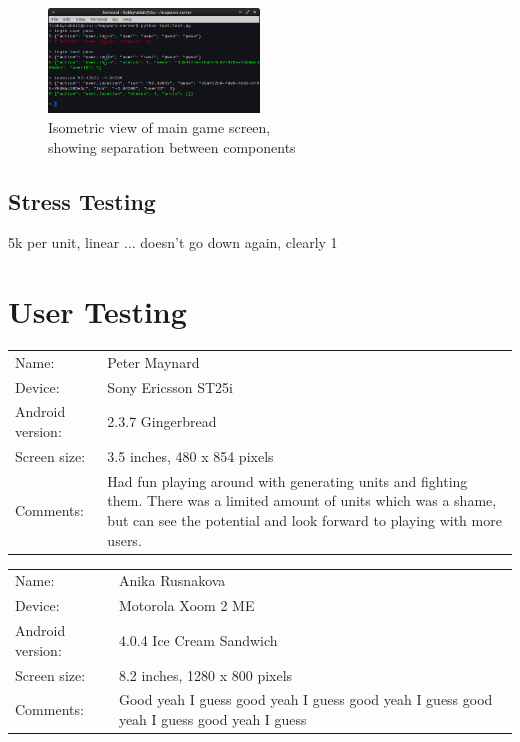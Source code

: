 \begin{figure}[H]
  \centering
   \includegraphics[width=0.5\textwidth]{Images/test.png}
  \caption{Isometric view of main game screen,\\showing separation between components}
  \label{fig:isogui}
\end{figure}

\subsection{Stress Testing}
5k per unit, linear ... doesn't go down again, clearly
1%



\section{User Testing}

\renewcommand{\arraystretch}{1.5}
\begin{tabular}{l  p{11cm}}
	\hline
	Name: & Peter Maynard \\
	\hdashline
	Device: & Sony Ericsson ST25i \\
	\hdashline
	Android version: & 2.3.7 Gingerbread \\
	\hdashline
	Screen size: & 3.5 inches, 480 x 854 pixels \\
	\hdashline
	Comments: & Had fun playing around with generating units and fighting them. There was a limited amount of units which was a shame, but can see the potential and look forward to playing with more users. \\
	\hline
\end{tabular}

\begin{tabular}{l  p{11cm}}
	\hline
	Name: & Anika Rusnakova \\
	\hdashline
	Device: & Motorola Xoom 2 ME \\
	\hdashline
	Android version: & 4.0.4 Ice Cream Sandwich \\
	\hdashline
	Screen size: & 8.2 inches, 1280 x 800 pixels \\
	\hdashline
	Comments: & Good yeah I guess good yeah I guess good yeah I guess good yeah I guess good yeah I guess \\
	\hline
\end{tabular}